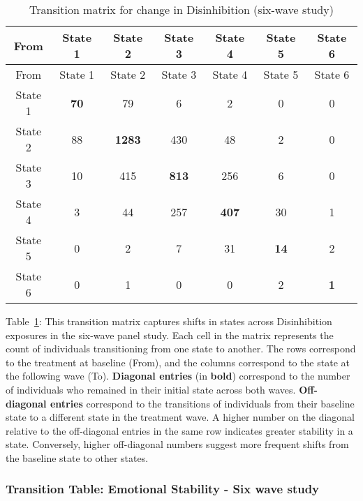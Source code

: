 \documentclass[
  single column]{article}
\begin{document}
\begin{longtable}[]{@{}ccccccc@{}}
\caption{Transition matrix for change in Disinhibition (six-wave
study)}\label{tbl-table-transition-disinhibition-long}\tabularnewline
\toprule\noalign{}
From & State 1 & State 2 & State 3 & State 4 & State 5 & State 6 \\
\midrule\noalign{}
\endfirsthead
\toprule\noalign{}
From & State 1 & State 2 & State 3 & State 4 & State 5 & State 6 \\
\midrule\noalign{}
\endhead
\bottomrule\noalign{}
\endlastfoot
State 1 & \textbf{70} & 79 & 6 & 2 & 0 & 0 \\
State 2 & 88 & \textbf{1283} & 430 & 48 & 2 & 0 \\
State 3 & 10 & 415 & \textbf{813} & 256 & 6 & 0 \\
State 4 & 3 & 44 & 257 & \textbf{407} & 30 & 1 \\
State 5 & 0 & 2 & 7 & 31 & \textbf{14} & 2 \\
State 6 & 0 & 1 & 0 & 0 & 2 & \textbf{1} \\
\end{longtable}

Table~\ref{tbl-table-transition-disinhibition-long}: This transition
matrix captures shifts in states across Disinhibition exposures in the
six-wave panel study. Each cell in the matrix represents the count of
individuals transitioning from one state to another. The rows correspond
to the treatment at baseline (From), and the columns correspond to the
state at the following wave (To). \textbf{Diagonal entries} (in
\textbf{bold}) correspond to the number of individuals who remained in
their initial state across both waves. \textbf{Off-diagonal entries}
correspond to the transitions of individuals from their baseline state
to a different state in the treatment wave. A higher number on the
diagonal relative to the off-diagonal entries in the same row indicates
greater stability in a state. Conversely, higher off-diagonal numbers
suggest more frequent shifts from the baseline state to other states.

\subsubsection{Transition Table: Emotional Stability - Six wave
study}\label{transition-table-emotional-stability---six-wave-study}
\end{document}
